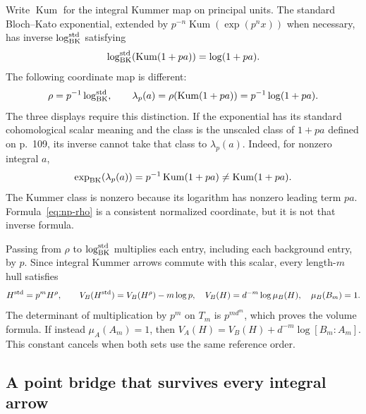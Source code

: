 Write $\operatorname{Kum}$ for the integral Kummer map on principal
units. The standard Bloch--Kato exponential, extended by
$p^{-n}\operatorname{Kum}(\exp(p^nx))$ when necessary, has inverse
$\log_{\rm BK}^{\rm std}$ satisfying
\[
 \log_{\rm BK}^{\rm std}(\operatorname{Kum}(1+pa))
       =\log(1+pa).
\]
The following coordinate map is different:
\begin{equation}\label{eq:np-rho}
 \rho=p^{-1}\log_{\rm BK}^{\rm std},\qquad
 \lambda_p(a)=\rho(\operatorname{Kum}(1+pa))
             =p^{-1}\log(1+pa).
\end{equation}
The three displays \cite[(9.7.1.1), (9.7.2.1)--(9.7.2.2),
PDF p.~110]{JoshiIII} require this distinction. If the exponential
has its standard cohomological scalar meaning and the class is the
unscaled class of $1+pa$ defined on p.~109, its inverse cannot take
that class to $\lambda_p(a)$. Indeed, for nonzero integral $a$,
\[
 \exp_{\rm BK}(\lambda_p(a))
       =p^{-1}\operatorname{Kum}(1+pa)
       \ne\operatorname{Kum}(1+pa).
\]
The Kummer class is nonzero because its logarithm has nonzero
leading term $pa$. Formula~\eqref{eq:np-rho} is a consistent
normalized coordinate, but it is not that inverse formula.

Passing from $\rho$ to $\log_{\rm BK}^{\rm std}$ multiplies each
entry, including each background entry, by $p$. Since integral
Kummer arrows commute with this scalar, every length-$m$ hull satisfies
\begin{equation}\label{eq:np-standard-scale}
 H^{\rm std}=p^mH^\rho,\qquad
 V_B(H^{\rm std})=V_B(H^\rho)-m\log p,
 \quad
 V_B(H)=d^{-m}\log\mu_B(H),\quad \mu_B(B_m)=1.
\end{equation}
The determinant of multiplication by $p^m$ on $T_m$ is $p^{md^m}$,
which proves the volume formula. If instead $\mu_A(A_m)=1$, then
$V_A(H)=V_B(H)+d^{-m}\log[B_m:A_m]$. This constant cancels when
both sets use the same reference order.

\subsection{A point bridge that survives every integral arrow}

